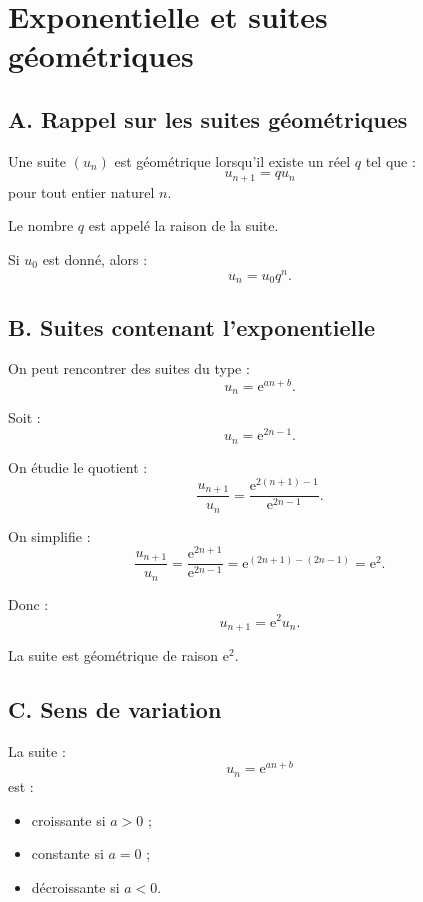 \documentclass[11pt,a4paper]{article}
\newcommand{\e}{\mathrm{e}}
\begin{document}
\section{Exponentielle et suites géométriques}

\subsection*{A. Rappel sur les suites géométriques}

\begin{definitionbox}
Une suite $(u_n)$ est géométrique lorsqu'il existe un réel $q$ tel que :
\[
u_{n+1}=qu_n
\]
pour tout entier naturel $n$.

Le nombre $q$ est appelé la raison de la suite.
\end{definitionbox}

Si $u_0$ est donné, alors :
\[
u_n=u_0q^n.
\]

\subsection*{B. Suites contenant l'exponentielle}

On peut rencontrer des suites du type :
\[
u_n=\e^{an+b}.
\]

\begin{exemplebox}
Soit :
\[
u_n=\e^{2n-1}.
\]

On étudie le quotient :
\[
\frac{u_{n+1}}{u_n}
=
\frac{\e^{2(n+1)-1}}{\e^{2n-1}}.
\]

On simplifie :
\[
\frac{u_{n+1}}{u_n}
=
\frac{\e^{2n+1}}{\e^{2n-1}}
=
\e^{(2n+1)-(2n-1)}
=
\e^2.
\]

Donc :
\[
u_{n+1}=\e^2u_n.
\]

La suite est géométrique de raison $\e^2$.
\end{exemplebox}

\subsection*{C. Sens de variation}

\begin{propriete}
La suite :
\[
u_n=\e^{an+b}
\]
est :
\begin{itemize}
    \item croissante si $a>0$ ;
    \item constante si $a=0$ ;
    \item décroissante si $a<0$.
\end{itemize}
\end{propriete}
\end{document}

